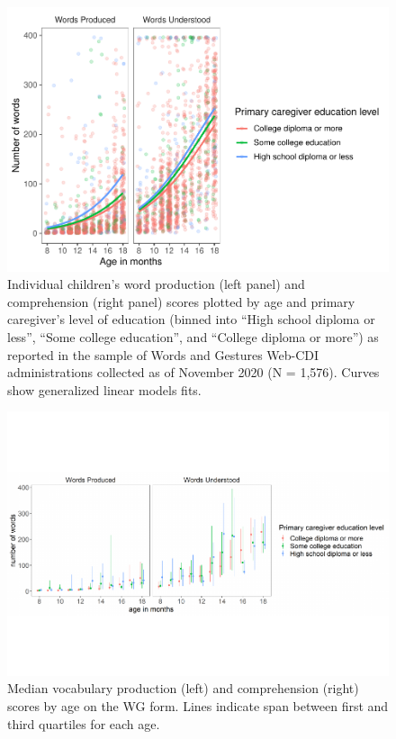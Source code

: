 \documentclass[
  english,
  ,man,floatsintext]{apa6}
\begin{document}
\begin{figure}
\centering
\includegraphics{webcdi_paper_files/figure-latex/wgglm-1.pdf}
\caption{\label{fig:wgglm}Individual children's word production (left panel) and comprehension (right panel) scores plotted by age and primary caregiver's level of education (binned into \enquote{High school diploma or less}, \enquote{Some college education}, and \enquote{College diploma or more}) as reported in the sample of Words and Gestures Web-CDI administrations collected as of November 2020 (N = 1,576). Curves show generalized linear models fits.}
\end{figure}

\begin{figure}
\centering
\includegraphics{webcdi_paper_files/figure-latex/wgmedfig-1.pdf}
\caption{\label{fig:wgmedfig}Median vocabulary production (left) and comprehension (right) scores by age on the WG form. Lines indicate span between first and third quartiles for each age.}
\end{figure}
\end{document}
